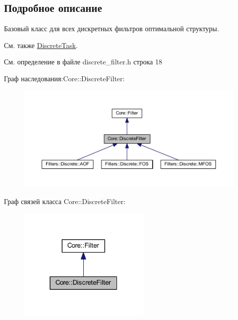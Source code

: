 \subsection{Подробное описание}
Базовый класс для всех дискретных фильтров оптимальной структуры. 

\begin{DoxySeeAlso}{См. также}
\hyperlink{class_core_1_1_discrete_task}{Discrete\+Task}. 
\end{DoxySeeAlso}


См. определение в файле discrete\+\_\+filter.\+h строка 18



Граф наследования\+:Core\+:\+:Discrete\+Filter\+:\nopagebreak
\begin{figure}[H]
\begin{center}
\leavevmode
\includegraphics[width=350pt]{class_core_1_1_discrete_filter__inherit__graph}
\end{center}
\end{figure}


Граф связей класса Core\+:\+:Discrete\+Filter\+:\nopagebreak
\begin{figure}[H]
\begin{center}
\leavevmode
\includegraphics[width=181pt]{class_core_1_1_discrete_filter__coll__graph}
\end{center}
\end{figure}


